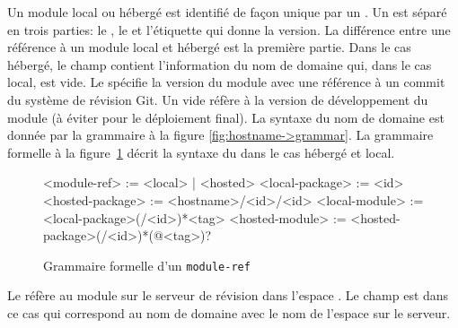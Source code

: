 Un module local ou hébergé est identifié de façon unique par un
.  Un  est séparé en trois parties: le
, le  et l'étiquette qui donne la version.  La
différence entre une référence à un module local et hébergé est la première
partie. Dans le cas hébergé, le champ  contient l'information
du nom de domaine qui, dans le cas local, est vide.  Le 
spécifie la version du module avec une référence à un commit du système de
révision Git. Un  vide réfère à la version de développement du
module (à éviter pour le déploiement final).  La syntaxe du nom de domaine est
donnée par la grammaire à la figure \ref{fig:hostname->grammar}.  La grammaire
formelle à la figure~\ref{fig:module-ref->grammar} décrit la syntaxe du
 dans le cas hébergé et local.\\

\begin{figure}[ht]
  \lstset{frame=single}
  \begin{mplisting}{0.8}
<module-ref>       := <local> | <hosted>
<local-package>    := <id>
<hosted-package>   := <hostname>/<id>/<id>
<local-module>     := <local-package>(/<id>)*<tag>
<hosted-module>    := <hosted-package>(/<id>)*(@<tag>)?
\end{mplisting}
  \caption{Grammaire formelle d'un \texttt{module-ref}}
  \label{fig:module-ref->grammar}
\end{figure}

Le   réfère
au module  sur le serveur de révision 
dans l'espace . Le champ  est dans ce
cas  qui correspond au nom de domaine avec
le nom de l'espace sur le serveur.


